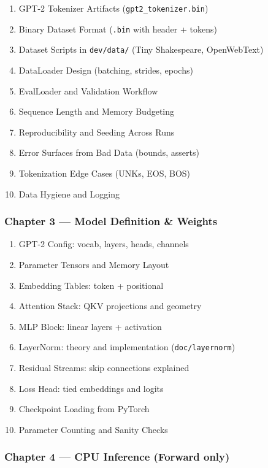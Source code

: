 \documentclass[
  letterpaper,
  DIV=11,
  numbers=noendperiod]{scrreprt}
\providecommand{\tightlist}{%
  \setlength{\itemsep}{0pt}\setlength{\parskip}{0pt}}
\begin{document}
\begin{enumerate}
\def\labelenumi{\arabic{enumi}.}
\setcounter{enumi}{10}
\tightlist
\item
  GPT-2 Tokenizer Artifacts (\texttt{gpt2\_tokenizer.bin})
\item
  Binary Dataset Format (\texttt{.bin} with header + tokens)
\item
  Dataset Scripts in \texttt{dev/data/} (Tiny Shakespeare, OpenWebText)
\item
  DataLoader Design (batching, strides, epochs)
\item
  EvalLoader and Validation Workflow
\item
  Sequence Length and Memory Budgeting
\item
  Reproducibility and Seeding Across Runs
\item
  Error Surfaces from Bad Data (bounds, asserts)
\item
  Tokenization Edge Cases (UNKs, EOS, BOS)
\item
  Data Hygiene and Logging
\end{enumerate}

\subsubsection{Chapter 3 --- Model Definition \&
Weights}\label{chapter-3-model-definition-weights}

\begin{enumerate}
\def\labelenumi{\arabic{enumi}.}
\setcounter{enumi}{20}
\tightlist
\item
  GPT-2 Config: vocab, layers, heads, channels
\item
  Parameter Tensors and Memory Layout
\item
  Embedding Tables: token + positional
\item
  Attention Stack: QKV projections and geometry
\item
  MLP Block: linear layers + activation
\item
  LayerNorm: theory and implementation (\texttt{doc/layernorm})
\item
  Residual Streams: skip connections explained
\item
  Loss Head: tied embeddings and logits
\item
  Checkpoint Loading from PyTorch
\item
  Parameter Counting and Sanity Checks
\end{enumerate}

\subsubsection{Chapter 4 --- CPU Inference (Forward
only)}\label{chapter-4-cpu-inference-forward-only}
\end{document}
